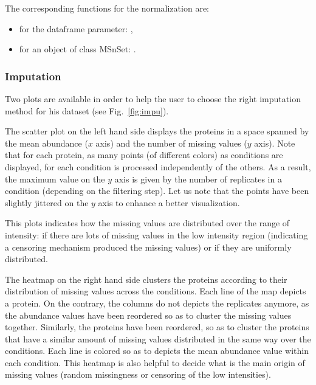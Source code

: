 \documentclass[12pt]{article}
\begin{document}
The corresponding functions for the normalization are:
\begin{itemize}
\item for the dataframe parameter: ,
\item for an object of class MSnSet: .
\end{itemize}

\subsubsection{Imputation}\label{imputation}

Two plots are available in order to help the user to choose the right imputation method for his dataset (see Fig.~\ref{fig:impu}).


The scatter plot on the left hand side displays the proteins in a space spanned by the mean abundance ($x$ axis) and the number of missing values ($y$ axis). Note that for each protein, as many points (of different colors) as conditions are displayed, for each condition is processed independently of the others. As a result, the maximum value on the $y$ axis is given by the number of replicates in a condition (depending on the filtering step). Let us note that the points have been slightly jittered on the $y$ axis to enhance a better visualization.

This plots indicates how the missing values are distributed over the range of intensity: if there are lots of missing values in the low intensity region (indicating a censoring mechanism produced the missing values) or if they are uniformly distributed. %


The heatmap on the right hand side clusters the proteins according to their distribution of missing values across the conditions. Each line of the map depicts a protein. On the contrary, the columns do not depicts the replicates anymore, as the abundance values have been reordered so as to cluster the missing values together. Similarly, the proteins have been reordered, so as to cluster the proteins that have a similar amount of missing values distributed in the same way over the conditions. Each line is colored so as to depicts the mean abundance value within each condition. This heatmap is also helpful to decide what is the main origin of missing values (random missingness or censoring of the low intensities).
\end{document}
